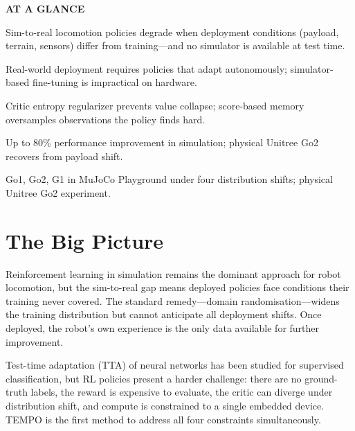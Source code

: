 \documentclass[10pt,twocolumn]{article}
\begin{document}
\begin{mdframed}[backgroundcolor=boxgray,linecolor=rulered,linewidth=1pt,
    innerleftmargin=6pt,innerrightmargin=6pt,
    innertopmargin=6pt,innerbottommargin=6pt]
\textbf{\small AT A GLANCE}\par\vspace{4pt}
\begin{description}[leftmargin=0pt,labelsep=4pt,itemsep=2pt,parsep=0pt,
    font=\small\bfseries]
  \item[Problem:] Sim-to-real locomotion policies degrade when
    deployment conditions (payload, terrain, sensors) differ from
    training---and no simulator is available at test time.
  \item[Why it matters:] Real-world deployment requires policies that
    adapt autonomously; simulator-based fine-tuning is impractical
    on hardware.
  \item[Method:] Critic entropy regularizer prevents value collapse;
    score-based memory oversamples observations the policy finds hard.
  \item[Result:] Up to 80\% performance improvement in simulation;
    physical Unitree Go2 recovers from payload shift.
  \item[Evidence:] Go1, Go2, G1 in MuJoCo Playground under four
    distribution shifts; physical Unitree Go2 experiment.
\end{description}
\end{mdframed}

\section{The Big Picture}

Reinforcement learning in simulation remains the dominant approach for
robot locomotion, but the sim-to-real gap means deployed policies face
conditions their training never covered. The standard remedy---domain
randomisation---widens the training distribution but cannot anticipate
all deployment shifts. Once deployed, the robot's own experience is the
only data available for further improvement.

Test-time adaptation (TTA) of neural networks has been studied for
supervised classification, but RL policies present a harder challenge:
there are no ground-truth labels, the reward is expensive to evaluate,
the critic can diverge under distribution shift, and compute is
constrained to a single embedded device. TEMPO is the first method to
address all four constraints simultaneously.
\end{document}
